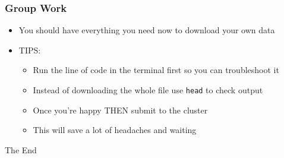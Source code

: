 \documentclass[14pt]{beamer}
\begin{document}
\begin{frame}
\frametitle{Group Work}
\begin{itemize}
	\item<+-> You should have everything you need now to download your own data
	\item<+-> TIPS:
	\begin{itemize}
		\item<+-> Run the line of code in the terminal first so you can troubleshoot it
		\item<+-> Instead of downloading the whole file use \texttt{head} to check output  
		\item<+-> Once you're happy THEN submit to the cluster
		\item<+-> This will save a lot of headaches and waiting 
	\end{itemize}
\end{itemize}
\end{frame}


\begin{frame}
\Huge{\centerline{The End}}
\end{frame}

\end{document}
